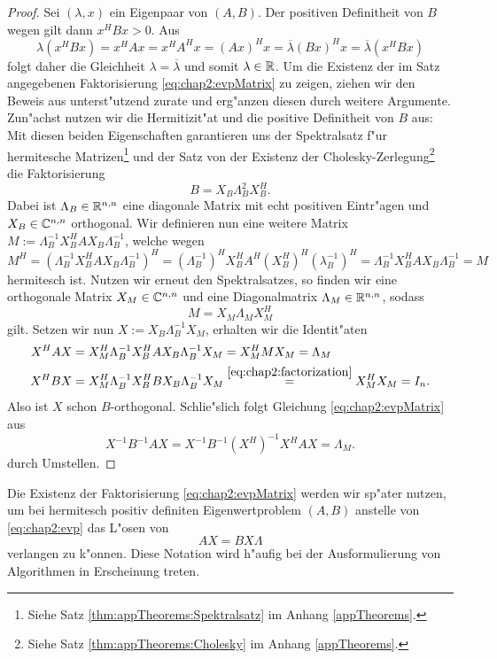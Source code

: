 \begin{proof}
Sei $(\lambda,x)$ ein Eigenpaar von $(A,B)$. Der positiven Definitheit von $B$ wegen gilt dann $x^H B x > 0$. Aus
\[
\lambda (x^H B x) = x^H Ax = x^H A^H x = (Ax)^H x
= \overline{\lambda} (Bx)^H x = \overline{\lambda} (x^H B x)
\]
folgt daher die Gleichheit $\lambda = \overline{\lambda}$ und somit $\lambda\in\mathbb{R}$.
 Um die Existenz der im Satz angegebenen Faktorisierung \eqref{eq:chap2:evpMatrix}
zu zeigen, ziehen wir den Beweis aus \cite[Theorem 15.3.2]{parlett} unterst"utzend zurate und erg"anzen diesen durch weitere Argumente.\\

Zun"achst nutzen wir die Hermitizit"at und die positive Definitheit von $B$ aus: Mit diesen beiden Eigenschaften garantieren uns der Spektralsatz f"ur hermitesche Matrizen\footnote{
Siehe Satz \ref{thm:appTheorems:Spektralsatz} im Anhang \ref{appTheorems}.}
und der Satz von der Existenz der Cholesky-Zerlegung\footnote{Siehe Satz \ref{thm:appTheorems:Cholesky} im Anhang \ref{appTheorems}.} die Faktorisierung
\begin{equation}\label{eq:chap2:factorization}
B = X_B \Lambda_B^2 X_B^H.
\end{equation}
Dabei ist $\Lambda_B\in\mathbb{R}^{n,n}$ eine diagonale Matrix mit echt positiven Eintr"agen und $X_B \in \mathbb{C}^{n,n}$ orthogonal.
Wir definieren nun eine weitere Matrix
$M:= \Lambda_B^{-1} X_B^H A X_B \Lambda_B^{-1}$,
welche wegen
\[
M^H = \left(\Lambda_B^{-1} X_B^H A X_B \Lambda_B^{-1}\right)^H
= (\Lambda_B^{-1})^{H} X_B^H A^H (X_B^H)^H (\lambda_B^{-1})^H
= \Lambda_B^{-1} X_B^H A X_B \Lambda_B^{-1}
= M
\]
hermitesch ist. Nutzen wir erneut den Spektralsatzes, so finden wir eine orthogonale Matrix $X_M\in\mathbb{C}^{n,n}$ und eine Diagonalmatrix $\Lambda_M\in\mathbb{R}^{n,n}$, sodass
\[
M = X_M \Lambda_M X_M^H
\]
gilt. Setzen wir nun $X:=X_B \Lambda_B^{-1} X_M$, erhalten wir die Identit"aten
\begin{align*}
X^H A X &= X_M^H \Lambda_B^{-1} X_B^H A X_B \Lambda_B^{-1} X_M = X_M^H M X_M = \Lambda_M\\
X^H B X &= X_M^H \Lambda_B^{-1} X_B^H B X_B \Lambda_B^{-1} X_M \overset{\eqref{eq:chap2:factorization}}{=} X_M^H X_M = I_n.
\end{align*}
Also ist $X$ schon $B$-orthogonal. Schlie"slich folgt Gleichung \eqref{eq:chap2:evpMatrix} aus
\[
X^{-1}B^{-1}AX = X^{-1}B^{-1} (X^H)^{-1} X^H AX = \Lambda_M.
\]
durch Umstellen.
\end{proof}

Die Existenz der Faktorisierung \eqref{eq:chap2:evpMatrix}
werden wir sp"ater nutzen, um bei hermitesch positiv definiten Eigenwertproblem $(A,B)$ anstelle von \eqref{eq:chap2:evp} das L"osen von
\begin{equation}\label{eq:chap2:evpMatrix2}
AX = BX\Lambda
\end{equation}
verlangen zu k"onnen. Diese Notation wird h"aufig bei der Ausformulierung von Algorithmen in Erscheinung treten.\\

